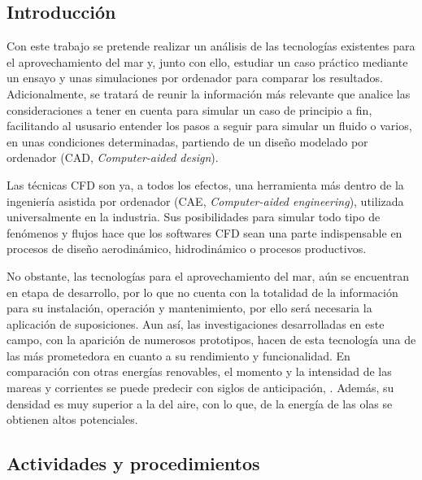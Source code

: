\subsection{Introducción}\label{header-n2}

Con este trabajo se pretende realizar un análisis de las tecnologías
existentes para el aprovechamiento del mar y, junto con ello, estudiar
un caso práctico mediante un ensayo y unas simulaciones por ordenador
para comparar los resultados. Adicionalmente, se tratará de reunir la
información más relevante que analice las consideraciones a tener en
cuenta para simular un caso de principio a fin, facilitando al ususario
entender los pasos a seguir para simular un fluido o varios, en unas
condiciones determinadas, partiendo de un diseño modelado por ordenador
(CAD, \emph{Computer-aided design}).

Las técnicas CFD son ya, a todos los efectos, una herramienta más dentro
de la ingeniería asistida por ordenador (CAE, \emph{Computer-aided
engineering}), utilizada universalmente en la industria. Sus
posibilidades para simular todo tipo de fenómenos y flujos hace que los
softwares CFD sean una parte indispensable en procesos de diseño
aerodinámico, hidrodinámico o procesos productivos.

No obstante, las tecnologías para el aprovechamiento del mar, aún se
encuentran en etapa de desarrollo, por lo que no cuenta con la totalidad
de la información para su instalación, operación y mantenimiento, por
ello será necesaria la aplicación de suposiciones. Aun así, las
investigaciones desarrolladas en este campo, con la aparición de
numerosos prototipos, hacen de esta tecnología una de las más
prometedora en cuanto a su rendimiento y funcionalidad. En comparación
con otras energías renovables, el momento y la intensidad de las mareas
y corrientes se puede predecir con siglos de anticipación,
\cite{romerogarcia10}. Además, su densidad es muy superior a la del aire,
con lo que, de la energía de las olas se obtienen altos potenciales.

\subsection{Actividades y procedimientos}\label{header-n9}

